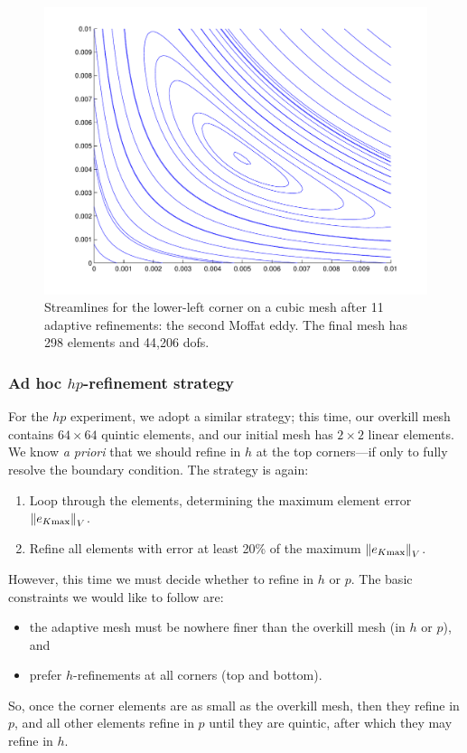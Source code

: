 \begin{figure}[h!b!p!]
\centering
\includegraphics[scale=0.42]{./figures/streamlines_minute_detail_p3_r11.pdf}
\caption{Streamlines for the lower-left corner on a cubic mesh after 11 adaptive refinements: the second Moffat eddy.  The final mesh has 298 elements and 44,206 dofs.}
\label{fig:streamlines_p3_r11}
\end{figure}

\subsubsection{Ad hoc $hp$-refinement strategy}
For the $hp$ experiment, we adopt a similar strategy; this time, our overkill mesh contains $64 \times 64$ quintic elements, and our initial mesh has $2 \times 2$ linear elements.  We know {\it a priori} that we should refine in $h$ at the top corners---if only to fully resolve the boundary condition.  The strategy is again:
\begin{enumerate}
\item Loop through the elements, determining the maximum element error $\norm{e_{K{\rm max}}}_{V}$.
\item Refine all elements with error at least 20\% of the maximum $\norm{e_{K{\rm max}}}_{V}$.
\end{enumerate}
However, this time we must decide whether to refine in $h$ or $p$.  The basic constraints we would like to follow are:
\begin{itemize}
\item the adaptive mesh must be nowhere finer than the overkill mesh (in $h$ or $p$), and
\item prefer $h$-refinements at all corners (top and bottom).
\end{itemize}
So, once the corner elements are as small as the overkill mesh, then they refine in $p$, and all other elements refine in $p$ until they are quintic, after which they may refine in $h$.

